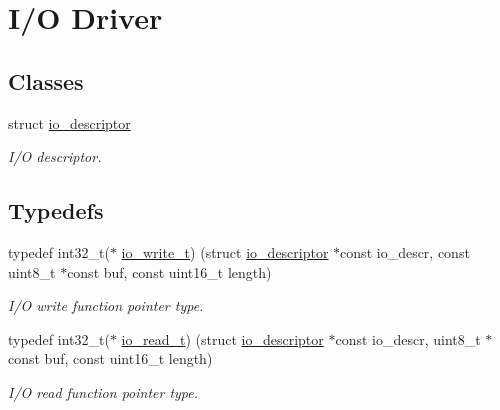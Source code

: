 \hypertarget{group__doc__driver__hal__helper__io}{}\section{I/O Driver}
\label{group__doc__driver__hal__helper__io}
\subsection*{Classes}
\begin{DoxyCompactItemize}
\item 
struct \hyperlink{structio__descriptor}{io\+\_\+descriptor}
\begin{DoxyCompactList}\small\item\em I/O descriptor. \end{DoxyCompactList}\end{DoxyCompactItemize}
\subsection*{Typedefs}
\begin{DoxyCompactItemize}
\item 
typedef int32\+\_\+t($\ast$ \hyperlink{group__doc__driver__hal__helper__io_gacb03c48993a6786f00946c196c40add1}{io\+\_\+write\+\_\+t}) (struct \hyperlink{structio__descriptor}{io\+\_\+descriptor} $\ast$const io\+\_\+descr, const uint8\+\_\+t $\ast$const buf, const uint16\+\_\+t length)
\begin{DoxyCompactList}\small\item\em I/O write function pointer type. \end{DoxyCompactList}\item 
typedef int32\+\_\+t($\ast$ \hyperlink{group__doc__driver__hal__helper__io_ga4d9ae58de2887289fe09eac6f0aa8be7}{io\+\_\+read\+\_\+t}) (struct \hyperlink{structio__descriptor}{io\+\_\+descriptor} $\ast$const io\+\_\+descr, uint8\+\_\+t $\ast$const buf, const uint16\+\_\+t length)
\begin{DoxyCompactList}\small\item\em I/O read function pointer type. \end{DoxyCompactList}\end{DoxyCompactItemize}
